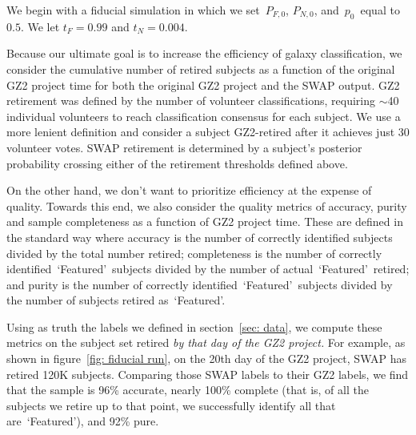 \documentclass[twocolumn]{aastex6}
\newcommand{\Pf}{$P_{F,0}$}
\newcommand{\Pn}{$P_{N,0}$}
\newcommand{\p}{$p_0$}
\newcommand{\feat}{`Featured'}
\begin{document}
We begin with a fiducial simulation in which we set~\Pf, \Pn, and~\p~equal to $0.5$.
We let $t_F = 0.99$ and $t_N = 0.004$. 

Because our ultimate goal is to increase the efficiency of galaxy classification,
we consider the cumulative number of retired subjects
as a function of the original GZ2 project time for both the original GZ2 project
and the SWAP output. 
GZ2 retirement was defined by the number of volunteer classifications, requiring
$\sim$40 individual volunteers to reach classification consensus for each subject. 
We use a more lenient definition and consider a subject GZ2-retired after it achieves 
just 30 volunteer votes. SWAP retirement is determined by a subject's posterior 
probability crossing either of the retirement thresholds defined above. 

On the other hand, we don't want to prioritize efficiency at the expense of quality. 
Towards this end, we also consider the quality metrics of accuracy, 
purity and sample completeness as a function of GZ2 project time.  These are 
defined in the standard way where accuracy is the number of correctly
identified subjects divided by the total number retired; completeness is the number of 
correctly identified~\feat~subjects divided by the number of actual~\feat~retired; 
and purity is the number of correctly identified~\feat~subjects divided by 
the number of subjects retired as~\feat. 

Using as truth the labels we defined in section~\ref{sec: data}, we compute
these metrics on the subject set retired \textit{by that day of the GZ2 project.} 
For example, as shown in figure~\ref{fig: fiducial run}, 
on the 20th day of the GZ2 project, 
SWAP has retired 120K subjects. Comparing those SWAP labels to their GZ2 labels, 
we find that the sample is 96\% accurate, nearly 100\% complete (that is, of all
the subjects we retire up to that point, we successfully identify all that are~\feat),
and 92\% pure. 
\end{document}
